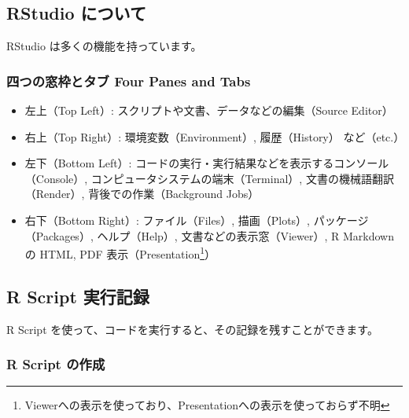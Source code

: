 \documentclass[
]{bxjsbook}
\providecommand{\tightlist}{%
  \setlength{\itemsep}{0pt}\setlength{\parskip}{0pt}}
\theoremstyle{definition}
\theoremstyle{definition}
\theoremstyle{definition}
\theoremstyle{definition}
\theoremstyle{remark}
\begin{document}
\hypertarget{rstudio-ux306bux3064ux3044ux3066}{%
\subsection{RStudio について}\label{rstudio-ux306bux3064ux3044ux3066}}

RStudio は多くの機能を持っています。

\hypertarget{ux56dbux3064ux306eux7a93ux67a0ux3068ux30bfux30d6-four-panes-and-tabs}{%
\subsubsection{四つの窓枠とタブ Four Panes and Tabs}\label{ux56dbux3064ux306eux7a93ux67a0ux3068ux30bfux30d6-four-panes-and-tabs}}

\begin{itemize}
\tightlist
\item
  左上（Top Left）: スクリプトや文書、データなどの編集（Source Editor）
\item
  右上（Top Right）: 環境変数（Environment）, 履歴（History） など（etc.）
\item
  左下（Bottom Left）: コードの実行・実行結果などを表示するコンソール（Console）, コンピュータシステムの端末（Terminal）, 文書の機械語翻訳（Render）, 背後での作業（Background Jobs）
\item
  右下（Bottom Right）: ファイル（Files）, 描画（Plots）, パッケージ（Packages）, ヘルプ（Help）, 文書などの表示窓（Viewer）, R Markdown の HTML, PDF 表示（Presentation\footnote{Viewerへの表示を使っており、Presentationへの表示を使っておらず不明}）
\end{itemize}

\hypertarget{r-script-ux5b9fux884cux8a18ux9332}{%
\subsection{R Script 実行記録}\label{r-script-ux5b9fux884cux8a18ux9332}}

R Script を使って、コードを実行すると、その記録を残すことができます。

\hypertarget{r-script-ux306eux4f5cux6210}{%
\subsubsection{R Script の作成}\label{r-script-ux306eux4f5cux6210}}
\end{document}
